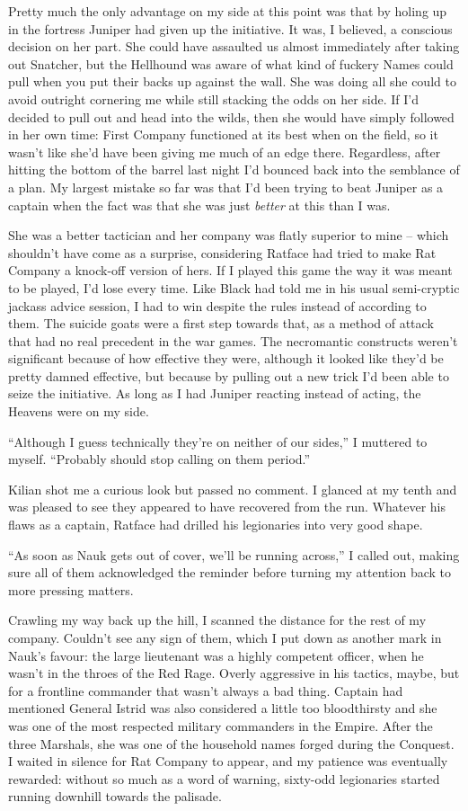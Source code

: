 \documentclass[12pt, openany]{book}
\begin{document}
Pretty much the only advantage on my side at this point was that by holing up in the fortress Juniper had given up the initiative. It was, I believed, a conscious decision on her part. She could have assaulted us almost immediately after taking out Snatcher, but the Hellhound was aware of what kind of fuckery Names could pull when you put their backs up against the wall. She was doing all she could to avoid outright cornering me while still stacking the odds on her side. If I’d decided to pull out and head into the wilds, then she would have simply followed in her own time: First Company functioned at its best when on the field, so it wasn’t like she’d have been giving me much of an edge there. Regardless, after hitting the bottom of the barrel last night I’d bounced back into the semblance of a plan. My largest mistake so far was that I’d been trying to beat Juniper as a captain when the fact was that she was just \textit{better} at this than I was.

She was a better tactician and her company was flatly superior to mine – which shouldn’t have come as a surprise, considering Ratface had tried to make Rat Company a knock-off version of hers. If I played this game the way it was meant to be played, I’d lose every time. Like Black had told me in his usual semi-cryptic jackass advice session, I had to win despite the rules instead of according to them. The suicide goats were a first step towards that, as a method of attack that had no real precedent in the war games. The necromantic constructs weren’t significant because of how effective they were, although it looked like they’d be pretty damned effective, but because by pulling out a new trick I’d been able to seize the initiative. As long as I had Juniper reacting instead of acting, the Heavens were on my side.

“Although I guess technically they’re on neither of our sides,” I muttered to myself. “Probably should stop calling on them period.”

Kilian shot me a curious look but passed no comment. I glanced at my tenth and was pleased to see they appeared to have recovered from the run. Whatever his flaws as a captain, Ratface had drilled his legionaries into very good shape.

“As soon as Nauk gets out of cover, we’ll be running across,” I called out, making sure all of them acknowledged the reminder before turning my attention back to more pressing matters.

Crawling my way back up the hill, I scanned the distance for the rest of my company. Couldn’t see any sign of them, which I put down as another mark in Nauk’s favour: the large lieutenant was a highly competent officer, when he wasn’t in the throes of the Red Rage. Overly aggressive in his tactics, maybe, but for a frontline commander that wasn’t always a bad thing. Captain had mentioned General Istrid was also considered a little too bloodthirsty and she was one of the most respected military commanders in the Empire. After the three Marshals, she was one of the household names forged during the Conquest. I waited in silence for Rat Company to appear, and my patience was eventually rewarded: without so much as a word of warning, sixty-odd legionaries started running downhill towards the palisade.
\end{document}

